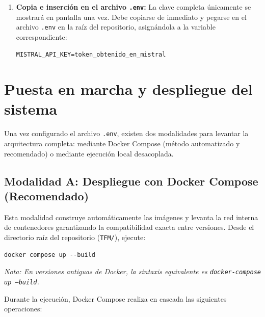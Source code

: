 \begin{enumerate}
    \item \textbf{Copia e inserción en el archivo \texttt{.env}:} La clave completa únicamente se mostrará en pantalla una vez. Debe copiarse de inmediato y pegarse en el archivo \texttt{.env} en la raíz del repositorio, asignándola a la variable correspondiente:
\begin{verbatim}
MISTRAL_API_KEY=token_obtenido_en_mistral
\end{verbatim}
\end{enumerate}

\section{Puesta en marcha y despliegue del sistema}

Una vez configurado el archivo \texttt{.env}, existen dos modalidades para levantar la arquitectura completa: mediante Docker Compose (método automatizado y recomendado) o mediante ejecución local desacoplada.

\subsection{Modalidad A: Despliegue con Docker Compose (Recomendado)}

Esta modalidad construye automáticamente las imágenes y levanta la red interna de contenedores garantizando la compatibilidad exacta entre versiones. Desde el directorio raíz del repositorio (\texttt{TFM/}), ejecute:

\begin{verbatim}
docker compose up --build
\end{verbatim}

\noindent\textit{Nota: En versiones antiguas de Docker, la sintaxis equivalente es \texttt{docker-compose up --build}.}

Durante la ejecución, Docker Compose realiza en cascada las siguientes operaciones:

